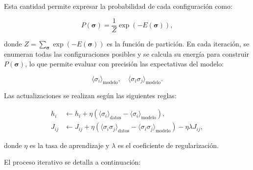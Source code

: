 \documentclass[a4paper,10pt,twocolumn]{article}
\begin{document}
Esta cantidad permite expresar la probabilidad de cada 
configuración como:

\[
P(\boldsymbol{\sigma}) = \frac{1}{Z} \exp\left(-E(\boldsymbol{\sigma})\right),
\]

donde \( Z = \sum_{\boldsymbol{\sigma}} \exp(-E(\boldsymbol{\sigma})) \) 
es la función de partición. En cada iteración, se enumeran 
todas las configuraciones posibles y se calcula su energía 
para construir \( P(\boldsymbol{\sigma}) \), lo que permite 
evaluar con precisión las expectativas del modelo:

\[
\langle \sigma_i \rangle_{\text{modelo}}, \quad 
\langle \sigma_i \sigma_j \rangle_{\text{modelo}}.
\]

Las actualizaciones se realizan según las siguientes reglas:

\begin{align}
    h_i &\leftarrow h_i + \eta \left( \langle \sigma_i \rangle_{\text{datos}} - \langle \sigma_i \rangle_{\text{modelo}} \right), \\
    J_{ij} &\leftarrow J_{ij} + \eta \left( \langle \sigma_i \sigma_j \rangle_{\text{datos}} - \langle \sigma_i \sigma_j \rangle_{\text{modelo}} \right) - \eta \lambda J_{ij},
\end{align}

donde \( \eta \) es la tasa de aprendizaje y \( \lambda \) es 
el coeficiente de regularización.

El proceso iterativo se detalla a continuación:
\end{document}
